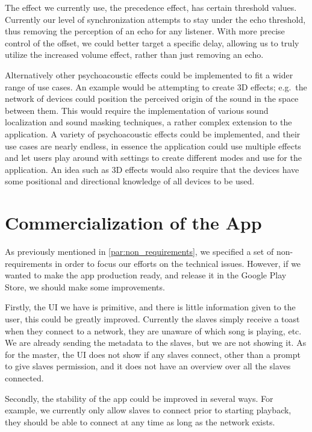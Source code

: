 \bigskip
The effect we currently use, the precedence effect, has certain threshold values.
Currently our level of synchronization attempts to stay under the echo threshold, thus removing the perception of an echo for any listener.
With more precise control of the offset, we could better target a specific delay, allowing us to truly utilize the increased volume effect, rather than just removing an echo.

Alternatively other psychoacoustic effects could be implemented to fit a wider range of use cases.
An example would be attempting to create 3D effects; e.g.~the network of devices could position the perceived origin of the sound in the space between them.
This would require the implementation of various sound localization and sound masking techniques, a rather complex extension to the application.
A variety of psychoacoustic effects could be implemented, and their use cases are nearly endless, in essence the application could use multiple effects and let users play around with settings to create different modes and use for the application.
An idea such as 3D effects would also require that the devices have some positional and directional knowledge of all devices to be used.

\section{Commercialization of the App}
As previously mentioned in \cref{par:non_requirements}, we specified a set of non-requirements in order to focus our efforts on the technical issues.
However, if we wanted to make the app production ready, and release it in the Google Play Store, we should make some improvements.

Firstly, the UI we have is primitive, and there is little information given to the user, this could be greatly improved.
Currently the slaves simply receive a toast when they connect to a network, they are unaware of which song is playing, etc.
We are already sending the metadata to the slaves, but we are not showing it.
As for the master, the UI does not show if any slaves connect, other than a prompt to give slaves permission, and it does not have an overview over all the slaves connected.

Secondly, the stability of the app could be improved in several ways.
For example, we currently only allow slaves to connect prior to starting playback, they should be able to connect at any time as long as the network exists.

